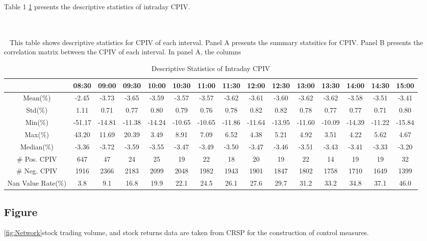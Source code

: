 Table 1 \ref{table:stats_of_CPIV} presents the descriptive statistics of intraday CPIV.



\begin{table}[h]
\centering
\caption{Descriptive Statistics of Intraday CPIV}

\tiny
~\\~\\~
\label{table:stats_of_CPIV}
{\medskip\scriptsize
This table shows descriptive statistics for CPIV of each interval. Panel A presents the summary statsitics for CPIV. Panel B presents the correlation matrix between the CPIV of each interval. In panel A, the columns  
}
\medskip
\begin{tabular}{ccccccccccccccc}
\toprule
\textbf{}        & 08:30 & 09:00 & 09:30 & 10:00 & 10:30 & 11:00 & 11:30 & 12:00 & 12:30 & 13:00 & 13:30 & 14:00 & 14:30 & 15:00 \\ \midrule
Mean(\%)         & -2.45 & -3.73 & -3.65 & -3.59 & -3.57 & -3.57 & -3.62 & -3.61 & -3.60 & -3.62 & -3.62 & -3.58 & -3.51 & -3.41 \\
Std(\%)          & 1.11  & 0.71  & 0.77  & 0.80  & 0.79  & 0.76  & 0.78  & 0.82  & 0.82  & 0.78  & 0.77  & 0.77  & 0.71  & 0.80  \\
Min(\%)          & -51.17 & -14.81 & -11.38 & -14.24 & -10.65 & -10.65 & -11.86 & -11.64 & -13.95 & -11.60 & -10.09 & -14.39 & -11.22 & -15.84 \\
Max(\%)          & 43.20  & 11.69  & 20.39  & 3.49   & 8.91   & 7.09   & 6.52   & 4.38   & 5.21   & 4.92   & 3.51   & 4.22   & 5.62   & 4.67   \\
Median(\%)       & -3.36  & -3.72  & -3.59  & -3.55  & -3.47  & -3.49  & -3.50  & -3.47  & -3.46  & -3.51  & -3.43  & -3.41  & -3.33  & -3.20  \\
\# Pos. CPIV     & 647   & 47    & 24    & 25    & 19    & 22    & 18    & 20    & 19    & 22    & 14    & 19    & 19    & 32    \\
\# Neg. CPIV     & 1916  & 2366  & 2183  & 2099  & 2048  & 1982  & 1943  & 1901  & 1847  & 1802  & 1758  & 1710  & 1649  & 1399  \\
Nan Value Rate(\%) & 3.8   & 9.1   & 16.8  & 19.9  & 22.1  & 24.5  & 26.1  & 27.6  & 29.7  & 31.2  & 33.2  & 34.8  & 37.1  & 46.0  \\ \bottomrule
\end{tabular}
\end{table}




\subsection{Figure}
\ref{fig:Network}stock trading volume, and stock returns data are taken from CRSP for the construction of control measures.

